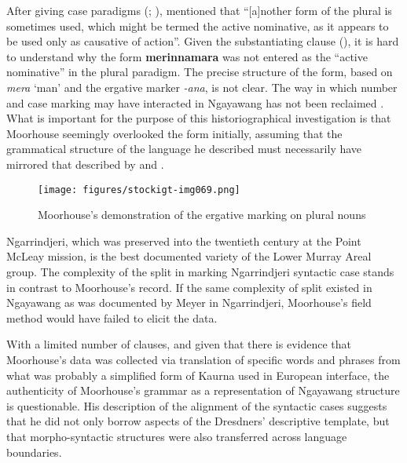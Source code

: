 After giving case paradigms (; ), \citet[6]{moorhouse_vocabulary_1846} mentioned that “[a]nother form of the plural is sometimes used, which might be termed the active nominative, as it appears to be used only as causative of action”. Given the substantiating clause (), it is hard to understand why the form \textbf{merinnamara} was not entered as the “active nominative” in the plural paradigm. The precise structure of the form, based on \textit{mera} `man' and the ergative marker \textit{-ana}, is not clear. The way in which number and case marking may have interacted in Ngayawang has not been reclaimed \citep[94--96]{Horgan2004}. What is important for the purpose of this historiographical investigation is that Moorhouse seemingly overlooked the form initially, assuming that the grammatical structure of the language he described must necessarily have mirrored that described by \citet{teichelmann_outlines_1840} and \citet{schurmann_letter_1844}.


\begin{figure}
\texttt{[image: figures/stockigt-img069.png]}
\caption{Moorhouse’s demonstration of the ergative marking on plural nouns \citeyearpar[6]{moorhouse_vocabulary_1846}}
\label{fig:key:123}
\end{figure}

Ngarrindjeri, which was preserved into the twentieth century at the Point McLeay mission, is the best documented variety of the Lower Murray Areal group. The complexity of the split in marking Ngarrindjeri syntactic case stands in contrast to Moorhouse’s record. If the same complexity of split existed in Ngayawang as was documented by Meyer in Ngarrindjeri, Moorhouse’s field method would have failed to elicit the data.

With a limited number of clauses, and given that there is evidence that Moorhouse’s data was collected via translation of specific words and phrases from what was probably a simplified form of Kaurna used in European interface, the authenticity of Moorhouse’s grammar as a representation of Ngayawang structure is questionable. His description of the alignment of the syntactic cases suggests that he did not only borrow aspects of the Dresdners' descriptive template, but that morpho-syntactic structures were also transferred across language boundaries.

